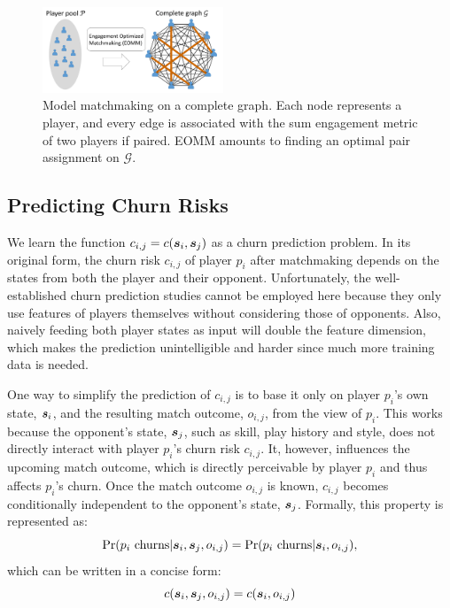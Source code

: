 \begin{figure}[tb]
\centering
\includegraphics[width=0.48\textwidth]{Figures/complete_matching.pdf}
\caption{Model matchmaking on a complete graph. Each node represents a player, and every edge is associated with the sum engagement metric of two players if paired. EOMM amounts to finding an optimal pair assignment on $\mathcal{G}$.}
\label{fig:matching}
\end{figure}


\subsection{Predicting Churn Risks}\label{sec:churn}
We learn the function $c_{i,j} = c(\boldsymbol{s}_i, \boldsymbol{s}_j)$ as a churn prediction problem. In its original form, the churn risk $c_{i,j}$ of player $p_i$ after matchmaking depends on the states from both the player and their opponent. Unfortunately, the well-established churn prediction studies cannot be employed here because  they only use features of players themselves without considering those of opponents. Also, naively feeding both player states as input will double the feature dimension, which makes the prediction unintelligible and harder since much more training data is needed. 

One way to simplify the prediction of $c_{i,j}$ is to base it only on player $p_i$'s own state, $\boldsymbol{s}_i$, and the resulting match outcome, $o_{i,j}$, from the view of $p_i$. This works because the opponent's state, $\boldsymbol{s}_j$, such as skill, play history and style, does not directly interact with player $p_i$'s churn risk $c_{i,j}$. It, however, influences the upcoming match outcome, which is directly perceivable by player $p_i$ and thus affects $p_i$'s churn. Once the match outcome $o_{i,j}$ is known, $c_{i,j}$ becomes conditionally independent to the opponent's state, $\boldsymbol{s}_j$. Formally, this property is represented as:
\begin{equation}\label{eqn:dependency_raw}
\Pr(p_i \text{ churns} | \boldsymbol{s}_i, \boldsymbol{s}_j, o_{i,j}) = \Pr(p_i \text{ churns} | \boldsymbol{s}_i, o_{i,j}),
\end{equation}
which can be written in a concise form:
\begin{equation}\label{eqn:dependency}
c(\boldsymbol{s}_i, \boldsymbol{s}_j, o_{i,j}) = c(\boldsymbol{s}_i, o_{i,j})
\end{equation}

